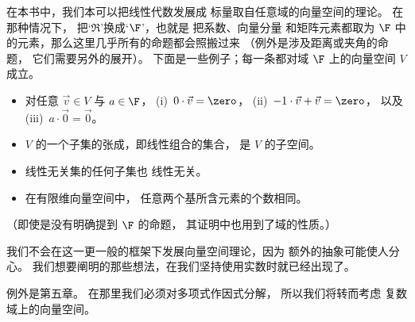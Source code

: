 在本书中，我们本可以把线性代数发展成
标量取自任意域的向量空间的理论。
在那种情况下，
把`\( \Re \)'换成`\( \F \)'，也就是
把系数、向量分量
和矩阵元素都取为 \( \F \) 中的元素，那么这里几乎所有的命题都会照搬过来
（例外是涉及距离或夹角的命题，
它们需要另外的展开）。
下面是一些例子；每一条都对域 \( \F \) 上的向量空间 \( V \) 成立。
\begin{itemize}
  \item[$*$] 对任意 \( \vec{v}\in V \) 与 \( a\in\F \)，
  (i)~\( 0\cdot\vec{v}=\zero \)，
  (ii)~\( -1\cdot\vec{v}+\vec{v}=\zero \)，
  以及 (iii)~\( a\cdot\vec{0}=\vec{0} \)。

  \item[$*$] \( V \) 的一个子集的张成，即线性组合的集合，
  是 \( V \) 的子空间。

  \item[$*$] 线性无关集的任何子集也
     线性无关。

  \item[$*$] 在有限维向量空间中，
    任意两个基所含元素的个数相同。
\end{itemize}
（即使是没有明确提到 \( \F \) 的命题，
其证明中也用到了域的性质。）

我们不会在这一更一般的框架下发展向量空间理论，因为
额外的抽象可能使人分心。
我们想要阐明的那些想法，在我们坚持使用实数时就已经出现了。

例外是第五章。
在那里我们必须对多项式作因式分解，
所以我们将转而考虑
复数域上的向量空间。

